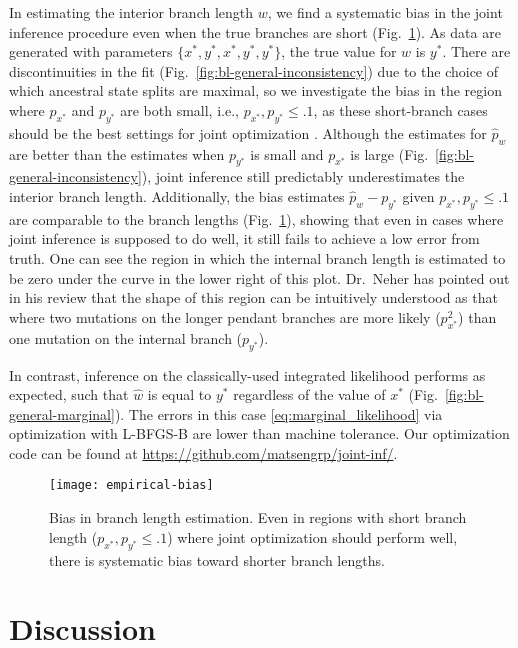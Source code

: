 \documentclass[11pt]{article}
\begin{document}
In estimating the interior branch length $w$, we find a systematic bias in the joint inference procedure even when the true branches are short (Fig.~\ref{fig:empirical-bias}).
As data are generated with parameters $\{x^*, y^*, x^*, y^*, y^*\}$, the true value for $w$ is $y^*$.
There are discontinuities in the fit (Fig.~\ref{fig:bl-general-inconsistency}) due to the choice of which ancestral state splits are maximal, so we investigate the bias in the region where $p_{x^*}$ and $p_{y^*}$ are both small, i.e., $p_{x^*}, p_{y^*} \le .1$, as these short-branch cases should be the best settings for joint optimization \citep{Sagulenko2018-xl}.
Although the estimates for $\hat{p}_w$ are better than the estimates when $p_{y^*}$ is small and $p_{x^*}$ is large (Fig.~\ref{fig:bl-general-inconsistency}), joint inference still predictably underestimates the interior branch length.
Additionally, the bias estimates $\hat{p}_w-p_{y^*}$ given $p_{x^*}, p_{y^*} \le .1$ are comparable to the branch lengths (Fig.~\ref{fig:empirical-bias}), showing that even in cases where joint inference is supposed to do well, it still fails to achieve a low error from truth.
One can see the region in which the internal branch length is estimated to be zero under the curve in the lower right of this plot.
Dr.\ Neher has pointed out in his review that the shape of this region can be intuitively understood as that where two mutations on the longer pendant branches are more likely ($p_{x^*}^2$) than one mutation on the internal branch ($p_{y^*}$).

In contrast, inference on the classically-used integrated likelihood performs as expected, such that $\hat{w}$ is equal to $y^*$ regardless of the value of $x^*$ (Fig.~\ref{fig:bl-general-marginal}).
The errors in this case \eqref{eq:marginal_likelihood} via optimization with L-BFGS-B are lower than machine tolerance.
Our optimization code can be found at \url{https://github.com/matsengrp/joint-inf/}.


\begin{figure}
\centering
\texttt{[image: empirical-bias]}
\caption{
Bias in branch length estimation.
Even in regions with short branch length ($p_{x^*}, p_{y^*} \le .1$) where joint optimization should perform well, there is systematic bias toward shorter branch lengths.
}
\label{fig:empirical-bias}
\end{figure}

\section*{Discussion}
\end{document}
